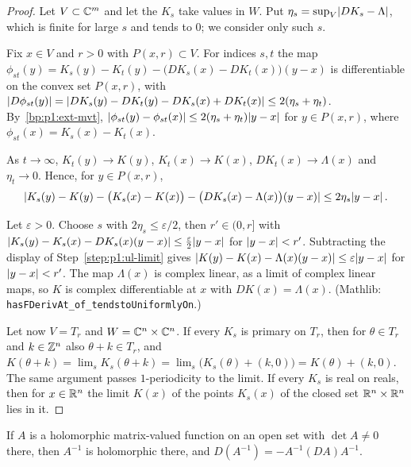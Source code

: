 \begin{proof}
Let $V\subset\mathbb{C}^m$ and let the $K_s$ take values in $W$. Put $\eta_s=\sup_V\lvert DK_s-\Lambda\rvert$, which is finite for large $s$ and tends to $0$;
we consider only such $s$.

\label{step:p1:ul-differences}
Fix $x\in V$ and $r>0$ with $P(x,r)\subset V$. For indices $s,t$ the map
$\phi_{st}(y)=K_s(y)-K_t(y)-\bigl(DK_s(x)-DK_t(x)\bigr)(y-x)$ is differentiable on the convex set
$P(x,r)$, with $\lvert D\phi_{st}(y)\rvert=\lvert DK_s(y)-DK_t(y)-DK_s(x)+DK_t(x)\rvert\le2(\eta_s+\eta_t)$.
By~\ref{bp:p1:ext-mvt}, $\lvert \phi_{st}(y)-\phi_{st}(x)\rvert\le2(\eta_s+\eta_t)\lvert y-x\rvert$ for $y\in P(x,r)$,
where $\phi_{st}(x)=K_s(x)-K_t(x)$.

\label{step:p1:ul-limit}
As $t\to\infty$, $K_t(y)\to K(y)$, $K_t(x)\to K(x)$, $DK_t(x)\to\Lambda(x)$ and $\eta_t\to0$. Hence, for
$y\in P(x,r)$,
\begin{equation*}
\lvert K_s(y)-K(y)-\bigl(K_s(x)-K(x)\bigr)-\bigl(DK_s(x)-\Lambda(x)\bigr)(y-x)\rvert\le2\eta_s\lvert y-x\rvert\,.
\end{equation*}

\label{step:p1:ul-derivative}
Let $\varepsilon>0$. Choose $s$ with $2\eta_s\le\varepsilon/2$, then $r'\in(0,r]$ with
$\lvert K_s(y)-K_s(x)-DK_s(x)(y-x)\rvert\le\frac\varepsilon2\lvert y-x\rvert$ for $\lvert y-x\rvert<r'$. Subtracting the
display of Step~\ref{step:p1:ul-limit} gives $\lvert K(y)-K(x)-\Lambda(x)(y-x)\rvert\le\varepsilon\lvert y-x\rvert$ for
$\lvert y-x\rvert<r'$. The map $\Lambda(x)$ is complex linear, as a limit of complex linear maps, so $K$ is
complex differentiable at $x$ with $DK(x)=\Lambda(x)$. (Mathlib:
\nolinkurl{hasFDerivAt_of_tendstoUniformlyOn}.)

\label{step:p1:ul-primary}
Let now $V=T_r$ and $W=\mathbb{C}^n\times\mathbb{C}^n$. If every $K_s$ is primary on $T_r$, then for $\theta\in T_r$ and
$k\in\mathbb{Z}^n$ also $\theta+k\in T_r$, and
$K(\theta+k)=\lim_sK_s(\theta+k)=\lim_s\bigl(K_s(\theta)+(k,0)\bigr)=K(\theta)+(k,0)$. The same argument
passes $1$-periodicity to the limit. If every $K_s$ is real on reals, then for $x\in\mathbb{R}^n$ the limit
$K(x)$ of the points $K_s(x)$ of the closed set $\mathbb{R}^n\times\mathbb{R}^n$ lies in it.
\end{proof}

\begin{lemma}\label{bp:p1:holomorphic-inverse}
If $A$ is a holomorphic matrix-valued function on an open set with $\det A\ne0$ there, then $A^{-1}$ is
holomorphic there, and $D(A^{-1})=-A^{-1}(DA)A^{-1}$.
\end{lemma}

